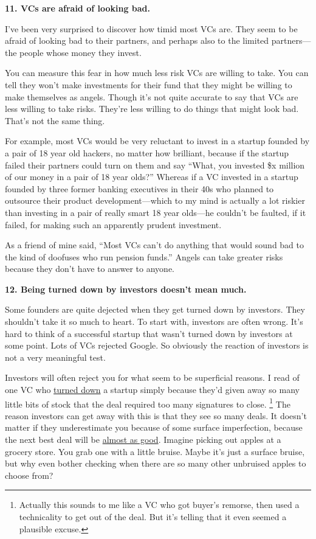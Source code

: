 \documentclass[12pt]{book}
\begin{document}
\textbf{11. VCs are afraid of looking bad.}

I've been very surprised to discover how timid most VCs are. They seem
to be afraid of looking bad to their partners, and perhaps also to the
limited partners---the people whose money they invest.

You can measure this fear in how much less risk VCs are willing to take.
You can tell they won't make investments for their fund that they might
be willing to make themselves as angels. Though it's not quite accurate
to say that VCs are less willing to take risks. They're less willing to
do things that might look bad. That's not the same thing.

For example, most VCs would be very reluctant to invest in a startup
founded by a pair of 18 year old hackers, no matter how brilliant,
because if the startup failed their partners could turn on them and say
``What, you invested \$x million of our money in a pair of 18 year
olds?'' Whereas if a VC invested in a startup founded by three former
banking executives in their 40s who planned to outsource their product
development---which to my mind is actually a lot riskier than investing
in a pair of really smart 18 year olds---he couldn't be faulted, if it
failed, for making such an apparently prudent investment.

As a friend of mine said, ``Most VCs can't do anything that would sound
bad to the kind of doofuses who run pension funds.'' Angels can take
greater risks because they don't have to answer to anyone.

\textbf{12. Being turned down by investors doesn't mean much.}

Some founders are quite dejected when they get turned down by investors.
They shouldn't take it so much to heart. To start with, investors are
often wrong. It's hard to think of a successful startup that wasn't
turned down by investors at some point. Lots of VCs rejected Google. So
obviously the reaction of investors is not a very meaningful test.

Investors will often reject you for what seem to be superficial reasons.
I read of one VC who
\href{http://ricksegal.typepad.com/pmv/2007/02/a_fatal_paper_c.html}{turned
down} a startup simply because they'd given away so many little bits of
stock that the deal required too many signatures to close.
\footnote{Actually this sounds to me like a VC who got buyer's remorse,
then used a technicality to get out of the deal. But it's telling that
it even seemed a plausible excuse.} The reason investors can get away with this is
that they see so many deals. It doesn't matter if they underestimate you
because of some surface imperfection, because the next best deal will be
\href{judgement.html}{almost as good}. Imagine picking out apples at a
grocery store. You grab one with a little bruise. Maybe it's just a
surface bruise, but why even bother checking when there are so many
other unbruised apples to choose from?
\end{document}
